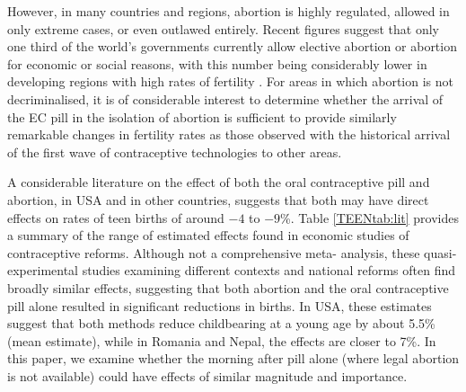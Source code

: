 However, in many countries and regions, abortion is highly regulated, allowed
in only extreme cases, or even outlawed entirely.  Recent figures suggest that 
only one third of the world's governments currently allow elective abortion or 
abortion for economic or social reasons, with this number being considerably 
lower in developing regions with high rates of fertility \citep{UN2014}.  For 
areas in which abortion is not decriminalised, it is of considerable interest 
to determine whether the arrival of the EC pill in the isolation of abortion 
is sufficient to provide similarly remarkable changes in fertility rates as 
those observed with the historical arrival of the first wave of contraceptive 
technologies to other areas.


A considerable literature on the effect of both the oral contraceptive pill
and abortion, in USA and in other countries, suggests that both may have direct
effects on rates of teen births of around $-4$ to $-9$\%.  Table
\ref{TEENtab:lit} provides a summary of the range of estimated effects found in
economic studies of contraceptive reforms.  Although not a comprehensive meta-%
analysis, these quasi-experimental studies examining different contexts and
national reforms often find broadly similar effects, suggesting that both
abortion and the oral contraceptive pill alone resulted in significant 
reductions in births. In USA, these estimates suggest that both methods reduce 
childbearing at a young age by about 5.5\% (mean estimate), while in Romania 
and Nepal, the effects are closer to 7\%.  In this paper, we examine whether the 
morning after pill alone (where legal abortion is not available) could have 
effects of similar magnitude and importance.

